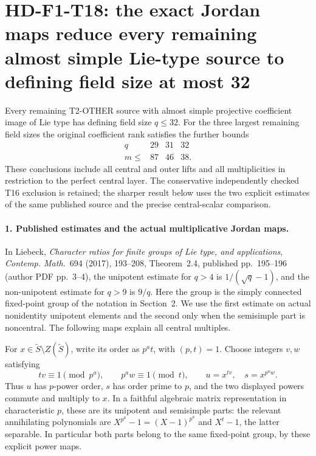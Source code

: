 \section[HD-F1-T18: defining fields at most 32]{HD-F1-T18: the exact Jordan maps reduce every remaining almost simple Lie-type source to defining field size at most 32}
\label{sec:f1-refined-field-lie-source-exclusion}

Every remaining T2-OTHER source with almost simple projective
coefficient image of Lie type has defining field size \(q\le32\).
For the three largest remaining field sizes the original
coefficient rank satisfies the further bounds
\[
 \begin{array}{c|ccc}
 q&29&31&32\\ \hline
 m\le&87&46&38.
 \end{array}
 \tag{F1T18.1}
\]
These conclusions include all central and outer lifts and
all multiplicities in restriction to the perfect central
layer. The conservative independently checked T16 exclusion
is retained; the sharper result below uses the two explicit
estimates of the same published source and the precise
central-scalar comparison.

\paragraph{1. Published estimates and the actual multiplicative Jordan maps.}
In Liebeck, \emph{Character ratios for finite groups of Lie
type, and applications}, \emph{Contemp. Math.}~694 (2017),
193--208, Theorem~2.4, published pp.~195--196 (author PDF
pp.~3--4), the unipotent estimate for \(q>4\) is
\(1/(\sqrt q-1)\), and the non-unipotent estimate for
\(q>9\) is \(9/q\). Here the group is the simply
connected fixed-point group of the notation in Section~2.
We use the first estimate on actual nonidentity unipotent
elements and the second only when the semisimple part is
noncentral. The following maps explain all central multiples.

For \(x\in\widetilde S\setminus Z(\widetilde S)\),
write its order as \(p^a t\), with \((p,t)=1\).
Choose integers \(v,w\) satisfying
\[
 tv\equiv1\pmod{p^a},\qquad
 p^aw\equiv1\pmod t,
 \qquad u=x^{tv},\quad s=x^{p^aw}.
 \tag{F1T18.2}
\]
Thus \(u\) has \(p\)-power order, \(s\) has order
prime to \(p\), and the two displayed powers commute
and multiply to \(x\). In a faithful algebraic matrix
representation in characteristic \(p\), these are its
unipotent and semisimple parts: the relevant annihilating
polynomials are \(X^{p^a}-1=(X-1)^{p^a}\) and
\(X^t-1\), the latter separable. In particular both
parts belong to the same fixed-point group, by these
explicit power maps.

